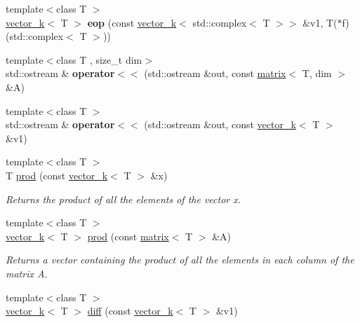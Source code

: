 \begin{DoxyCompactItemize}
\item 
\hypertarget{namespacekeycpp_a31115adc10089fbbc732d59362890af2}{{\footnotesize template$<$class T $>$ }\\\hyperlink{classkeycpp_1_1vector__k}{vector\-\_\-k}$<$ T $>$ {\bfseries eop} (const \hyperlink{classkeycpp_1_1vector__k}{vector\-\_\-k}$<$ std\-::complex$<$ T $>$$>$ \&v1, T($\ast$f)(std\-::complex$<$ T $>$))}\label{namespacekeycpp_a31115adc10089fbbc732d59362890af2}

\item 
\hypertarget{namespacekeycpp_abdc9a2ec3fa602bd1bad9cd9ea14038e}{{\footnotesize template$<$class T , size\-\_\-t dim$>$ }\\std\-::ostream \& {\bfseries operator$<$$<$} (std\-::ostream \&out, const \hyperlink{classkeycpp_1_1matrix}{matrix}$<$ T, dim $>$ \&A)}\label{namespacekeycpp_abdc9a2ec3fa602bd1bad9cd9ea14038e}

\item 
\hypertarget{namespacekeycpp_a86f8946c126102b4467b70da16766b7a}{{\footnotesize template$<$class T $>$ }\\std\-::ostream \& {\bfseries operator$<$$<$} (std\-::ostream \&out, const \hyperlink{classkeycpp_1_1vector__k}{vector\-\_\-k}$<$ T $>$ \&v1)}\label{namespacekeycpp_a86f8946c126102b4467b70da16766b7a}

\item 
\hypertarget{namespacekeycpp_add55ad2a40111d6368744a3d4144f25a}{{\footnotesize template$<$class T $>$ }\\T \hyperlink{namespacekeycpp_add55ad2a40111d6368744a3d4144f25a}{prod} (const \hyperlink{classkeycpp_1_1vector__k}{vector\-\_\-k}$<$ T $>$ \&x)}\label{namespacekeycpp_add55ad2a40111d6368744a3d4144f25a}

\begin{DoxyCompactList}\small\item\em Returns the product of all the elements of the vector x. \end{DoxyCompactList}\item 
\hypertarget{namespacekeycpp_af5471fc9074471701bde9e68eb7971b4}{{\footnotesize template$<$class T $>$ }\\\hyperlink{classkeycpp_1_1vector__k}{vector\-\_\-k}$<$ T $>$ \hyperlink{namespacekeycpp_af5471fc9074471701bde9e68eb7971b4}{prod} (const \hyperlink{classkeycpp_1_1matrix}{matrix}$<$ T $>$ \&A)}\label{namespacekeycpp_af5471fc9074471701bde9e68eb7971b4}

\begin{DoxyCompactList}\small\item\em Returns a vector containing the product of all the elements in each column of the matrix A. \end{DoxyCompactList}\item 
\hypertarget{namespacekeycpp_a52c37ec9c41349fd6bd862b8ebdd01bb}{{\footnotesize template$<$class T $>$ }\\\hyperlink{classkeycpp_1_1vector__k}{vector\-\_\-k}$<$ T $>$ \hyperlink{namespacekeycpp_a52c37ec9c41349fd6bd862b8ebdd01bb}{diff} (const \hyperlink{classkeycpp_1_1vector__k}{vector\-\_\-k}$<$ T $>$ \&v1)}\label{namespacekeycpp_a52c37ec9c41349fd6bd862b8ebdd01bb}


\end{DoxyCompactItemize}
